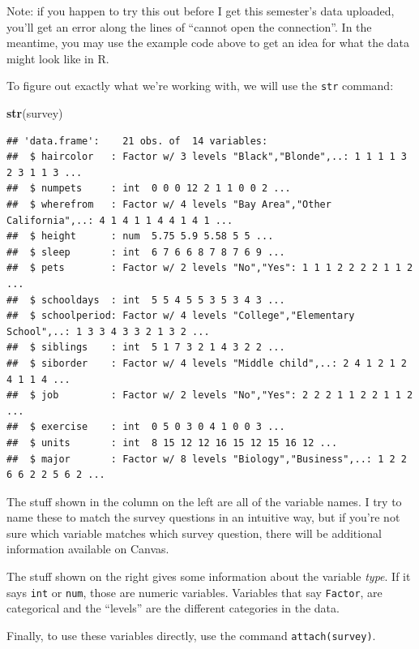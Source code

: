 \documentclass[
]{book}
\newenvironment{Shaded}{\begin{snugshade}}{\end{snugshade}}
\newcommand{\FunctionTok}[1]{\textcolor[rgb]{0.13,0.29,0.53}{\textbf{#1}}}
\newcommand{\NormalTok}[1]{#1}
\begin{document}
Note: if you happen to try this out before I get this semester's data uploaded, you'll get an error along the lines of ``cannot open the connection''. In the meantime, you may use the example code above to get an idea for what the data might look like in R.

To figure out exactly what we're working with, we will use the \texttt{str} command:

\begin{Shaded}
\begin{Highlighting}[]
\FunctionTok{str}\NormalTok{(survey)}
\end{Highlighting}
\end{Shaded}

\begin{verbatim}
## 'data.frame':    21 obs. of  14 variables:
##  $ haircolor   : Factor w/ 3 levels "Black","Blonde",..: 1 1 1 1 3 2 3 1 1 3 ...
##  $ numpets     : int  0 0 0 12 2 1 1 0 0 2 ...
##  $ wherefrom   : Factor w/ 4 levels "Bay Area","Other California",..: 4 1 4 1 1 4 4 1 4 1 ...
##  $ height      : num  5.75 5.9 5.58 5 5 ...
##  $ sleep       : int  6 7 6 6 8 7 8 7 6 9 ...
##  $ pets        : Factor w/ 2 levels "No","Yes": 1 1 1 2 2 2 2 1 1 2 ...
##  $ schooldays  : int  5 5 4 5 5 3 5 3 4 3 ...
##  $ schoolperiod: Factor w/ 4 levels "College","Elementary School",..: 1 3 3 4 3 3 2 1 3 2 ...
##  $ siblings    : int  5 1 7 3 2 1 4 3 2 2 ...
##  $ siborder    : Factor w/ 4 levels "Middle child",..: 2 4 1 2 1 2 4 1 1 4 ...
##  $ job         : Factor w/ 2 levels "No","Yes": 2 2 2 1 1 2 2 1 1 2 ...
##  $ exercise    : int  0 5 0 3 0 4 1 0 0 3 ...
##  $ units       : int  8 15 12 12 16 15 12 15 16 12 ...
##  $ major       : Factor w/ 8 levels "Biology","Business",..: 1 2 2 6 6 2 2 5 6 2 ...
\end{verbatim}

The stuff shown in the column on the left are all of the variable names. I try to name these to match the survey questions in an intuitive way, but if you're not sure which variable matches which survey question, there will be additional information available on Canvas.

The stuff shown on the right gives some information about the variable \emph{type}. If it says \texttt{int} or \texttt{num}, those are numeric variables. Variables that say \texttt{Factor}, are categorical and the ``levels'' are the different categories in the data.

Finally, to use these variables directly, use the command \texttt{attach(survey)}.
\end{document}
